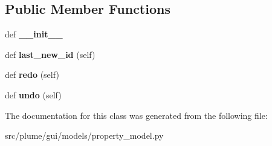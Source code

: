 \subsection*{Public Member Functions}
\begin{DoxyCompactItemize}
\item 
def {\bfseries \+\_\+\+\_\+init\+\_\+\+\_\+}\hypertarget{classplume-creator_1_1src_1_1plume_1_1gui_1_1models_1_1property__model_1_1_set_property_command_acc6a537224bba8b9922f2fee1ee391a3}{}\label{classplume-creator_1_1src_1_1plume_1_1gui_1_1models_1_1property__model_1_1_set_property_command_acc6a537224bba8b9922f2fee1ee391a3}

\item 
def {\bfseries last\+\_\+new\+\_\+id} (self)\hypertarget{classplume-creator_1_1src_1_1plume_1_1gui_1_1models_1_1property__model_1_1_set_property_command_a3b4c36f8674b9c652954e8ffae81a56e}{}\label{classplume-creator_1_1src_1_1plume_1_1gui_1_1models_1_1property__model_1_1_set_property_command_a3b4c36f8674b9c652954e8ffae81a56e}

\item 
def {\bfseries redo} (self)\hypertarget{classplume-creator_1_1src_1_1plume_1_1gui_1_1models_1_1property__model_1_1_set_property_command_ac4386e1bd7f2d1f86c611bed6db2a06f}{}\label{classplume-creator_1_1src_1_1plume_1_1gui_1_1models_1_1property__model_1_1_set_property_command_ac4386e1bd7f2d1f86c611bed6db2a06f}

\item 
def {\bfseries undo} (self)\hypertarget{classplume-creator_1_1src_1_1plume_1_1gui_1_1models_1_1property__model_1_1_set_property_command_a0ad650b13319d008c376348566380b09}{}\label{classplume-creator_1_1src_1_1plume_1_1gui_1_1models_1_1property__model_1_1_set_property_command_a0ad650b13319d008c376348566380b09}

\end{DoxyCompactItemize}


The documentation for this class was generated from the following file\+:\begin{DoxyCompactItemize}
\item 
src/plume/gui/models/property\+\_\+model.\+py\end{DoxyCompactItemize}

